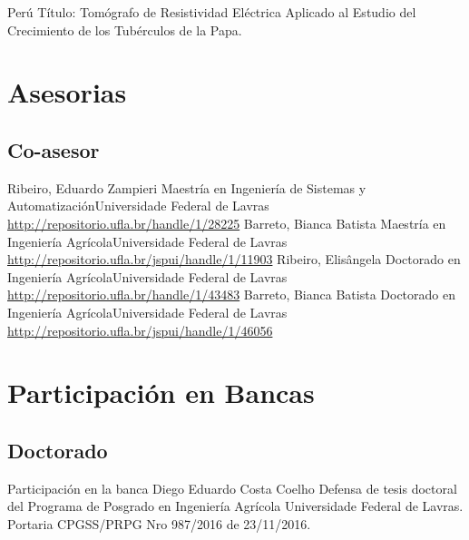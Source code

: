 \documentclass[11pt,a4paper,sans]{moderncv} %
\begin{document}
	      {Perú}{}{}
	      {Título: Tomógrafo de Resistividad Eléctrica Aplicado al Estudio del Crecimiento de los Tubérculos de la Papa.}


	       
\section{Asesorias}
\subsection{Co-asesor}
			{Ribeiro, Eduardo Zampieri}
			{Maestría en Ingeniería de Sistemas y Automatización}{Universidade Federal de Lavras}
			{\url{http://repositorio.ufla.br/handle/1/28225}}
			{Barreto, Bianca Batista}
			{Maestría en Ingeniería Agrícola}{Universidade Federal de Lavras}
			{\url{http://repositorio.ufla.br/jspui/handle/1/11903}}
			{Ribeiro, Elisângela }
			{Doctorado en Ingeniería Agrícola}{Universidade Federal de Lavras}
			{\url{http://repositorio.ufla.br/handle/1/43483}}
			{Barreto, Bianca Batista}
			{Doctorado en Ingeniería Agrícola}{Universidade Federal de Lavras}
			{\url{http://repositorio.ufla.br/jspui/handle/1/46056}}
			
\section{Participación en Bancas}
\subsection{Doctorado}
			{Participación en la banca Diego Eduardo Costa Coelho}
			{Defensa de tesis doctoral del Programa de Posgrado en Ingeniería Agrícola}{}
			{Universidade Federal de Lavras. Portaria CPGSS/PRPG Nro 987/2016 de 23/11/2016.}
\end{document}
